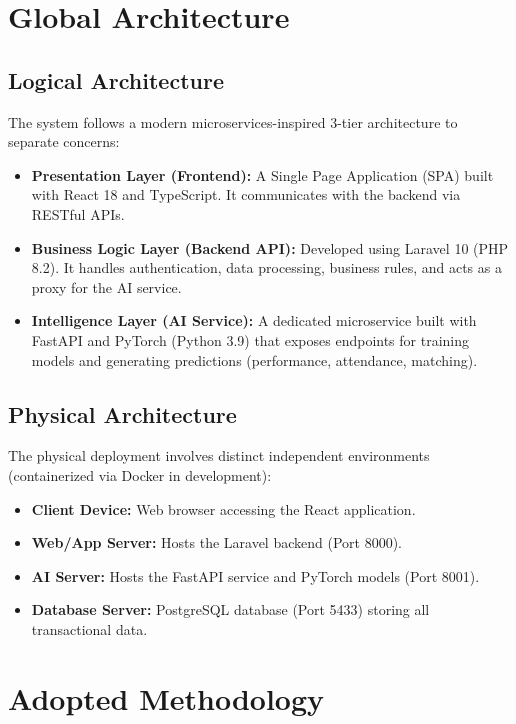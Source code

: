 \section{Global Architecture}

\subsection{Logical Architecture}
The system follows a modern microservices-inspired 3-tier architecture to separate concerns:
\begin{itemize}
    \item \textbf{Presentation Layer (Frontend):} A Single Page Application (SPA) built with React 18 and TypeScript. It communicates with the backend via RESTful APIs.
    \item \textbf{Business Logic Layer (Backend API):} Developed using Laravel 10 (PHP 8.2). It handles authentication, data processing, business rules, and acts as a proxy for the AI service.
    \item \textbf{Intelligence Layer (AI Service):} A dedicated microservice built with FastAPI and PyTorch (Python 3.9) that exposes endpoints for training models and generating predictions (performance, attendance, matching).
\end{itemize}

\subsection{Physical Architecture}
The physical deployment involves distinct independent environments (containerized via Docker in development):
\begin{itemize}
    \item \textbf{Client Device:} Web browser accessing the React application.
    \item \textbf{Web/App Server:} Hosts the Laravel backend (Port 8000).
    \item \textbf{AI Server:} Hosts the FastAPI service and PyTorch models (Port 8001).
    \item \textbf{Database Server:} PostgreSQL database (Port 5433) storing all transactional data.
\end{itemize}

\section{Adopted Methodology}

